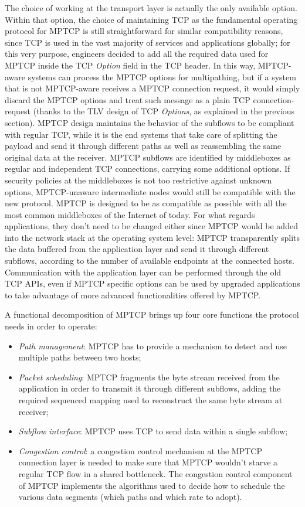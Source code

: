 The choice of working at the transport layer is actually the only available option. Within that option, the choice of maintaining TCP as the fundamental operating protocol for MPTCP is still straightforward for similar compatibility reasons, since TCP is used in the vast majority of services and applications globally; for this very purpose, engineers decided to add all the required data used for MPTCP inside the TCP \textit{Option} field in the TCP header. In this way, MPTCP-aware systems can process the MPTCP options for multipathing, but if a system that is not MPTCP-aware receives a MPTCP connection request, it would simply discard the MPTCP options and treat such message as a plain TCP connection-request (thanks to the TLV design of TCP \textit{Options}, as explained in the previous section). 
MPTCP design maintains the behavior of the subflows to be compliant with regular TCP, while it is the end systems that take care of splitting the payload and send it through different paths as well as reassembling the same original data at the receiver. MPTCP subflows are identified by middleboxes as regular and independent TCP connections, carrying some additional options. If security policies at the middleboxes is not too restrictive against unknown options, MPTCP-unaware intermediate nodes would still be compatible with the new protocol. MPTCP is designed to be as compatible as possible with all the most common middleboxes of the Internet of today.
For what regards applications, they don't need to be changed either since MPTCP would be added into the network stack at the operating system level: MPTCP transparently splits the data buffered from the application layer and send it through different subflows, according to the number of available endpoints at the connected hosts. Communication with the application layer can be performed through the old TCP APIs, even if MPTCP specific options can be used by upgraded applications to take advantage of more advanced functionalities offered by MPTCP.

A functional decomposition of MPTCP brings up four core functions the protocol needs in order to operate:
\begin{itemize}
  \item \textit{Path management}: MPTCP has to provide a mechanism to detect and use multiple paths between two hosts;
  \item \textit{Packet scheduling}: MPTCP fragments the byte stream received from the application in order to transmit it through different subflows, adding the required sequenced mapping used to reconstruct the same byte stream at receiver;
  \item \textit{Subflow interface}: MPTCP uses TCP to send data within a single subflow;
  \item \textit{Congestion control}: a congestion control mechanism at the MPTCP connection layer is needed to make sure that MPTCP wouldn't starve a regular TCP flow in a shared bottleneck. The congestion control component of MPTCP implements the algorithms used to decide how to schedule the various data segments (which paths and which rate to adopt).
  \end{itemize}

